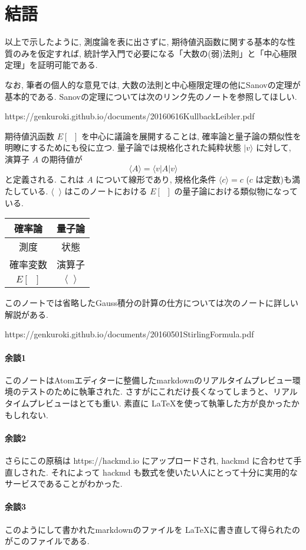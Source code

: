 \documentclass[12pt,twoside]{jarticle}
\newcommand\bra{\langle}
\newcommand\ket{\rangle}
\theoremstyle{jplain}
\theoremstyle{jplain}
\theoremstyle{jplain}
\numberwithin{theorem}{section}
\numberwithin{equation}{section}
\numberwithin{figure}{section}
\numberwithin{table}{section}
\begin{document}

\section{結語}

以上で示したように, 測度論を表に出さずに, 期待値汎函数に関する基本的な性質のみを仮定すれば, 統計学入門で必要になる「大数の(弱)法則」と「中心極限定理」を証明可能である.

なお, 筆者の個人的な意見では, 大数の法則と中心極限定理の他にSanovの定理が基本的である. Sanovの定理については次のリンク先のノートを参照してほしい.

https://genkuroki.github.io/documents/20160616KullbackLeibler.pdf

期待値汎函数 $E[\;\;]$ を中心に議論を展開することは, 確率論と量子論の類似性を明瞭にするためにも役に立つ. 量子論では規格化された純粋状態 $|v\ket$ に対して, 演算子 $A$ の期待値が
$$
\bra A\ket = \bra v|A|v\ket
$$
と定義される. これは $A$ について線形であり, 規格化条件 $\bra c\ket = c$ ($c$ は定数)も満たしている. $\bra\;\;\ket$ はこのノートにおける $E[\;\;]$ の量子論における類似物になっている.

\begin{center}
\begin{tabular}{|c|c|}
  \hline
  確率論   & 量子論       \\
  \hline \hline
  測度     & 状態         \\
  \hline
  確率変数 & 演算子       \\
  \hline
  $E[\;\;]$&$\bra\;\;\ket$\\
  \hline
\end{tabular}
\end{center}

このノートでは省略したGauss積分の計算の仕方については次のノートに詳しい解説がある.

https://genkuroki.github.io/documents/20160501StirlingFormula.pdf

\paragraph{余談1} このノートはAtomエディターに整備したmarkdownのリアルタイムプレビュー環境のテストのために執筆された. さすがにこれだけ長くなってしまうと、リアルタイムプレビューはとても重い. 素直に \LaTeX を使って執筆した方が良かったかもしれない.

\paragraph{余談2} さらにこの原稿は https://hackmd.io にアップロードされ, hackmd に合わせて手直しされた. それによって hackmd も数式を使いたい人にとって十分に実用的なサービスであることがわかった.

\paragraph{余談3} このようにして書かれたmarkdownのファイルを \LaTeX に書き直して得られたのがこのファイルである.

\end{document}
